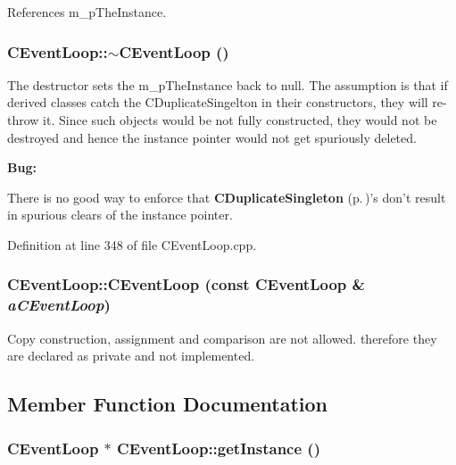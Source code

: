 References m\_\-p\-The\-Instance.
\subsubsection{\setlength{\rightskip}{0pt plus 5cm}CEvent\-Loop::$\sim$CEvent\-Loop ()\hspace{0.3cm}{\tt  [virtual]}}\label{classCEventLoop_a1}


The destructor sets the m\_\-p\-The\-Instance back to null. The assumption is that if derived classes catch the CDuplicate\-Singelton in their  constructors, they will re-throw it. Since such objects would be not fully constructed, they would not be destroyed and hence the instance pointer would not get spuriously deleted.



\begin{Desc}
\item[{\bf Bug: }]\par
There is no good way to enforce that {\bf CDuplicate\-Singleton} {\rm (p.\,\pageref{classCDuplicateSingleton})}'s don't result in spurious clears of the instance pointer.\end{Desc}
 

Definition at line 348 of file CEvent\-Loop.cpp.
\subsubsection{\setlength{\rightskip}{0pt plus 5cm}CEvent\-Loop::CEvent\-Loop (const CEvent\-Loop \& {\em a\-CEvent\-Loop})\hspace{0.3cm}{\tt  [private]}}\label{classCEventLoop_c1}


Copy construction, assignment and comparison are not allowed. therefore they are declared as private and not implemented. 

\subsection{Member Function Documentation}
\subsubsection{\setlength{\rightskip}{0pt plus 5cm}CEvent\-Loop $\ast$ CEvent\-Loop::get\-Instance ()\hspace{0.3cm}{\tt  [static]}}\label{classCEventLoop_d0}


